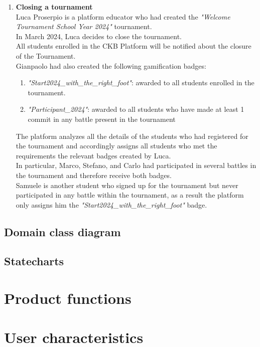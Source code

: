 \begin{enumerate}
\item \textbf{Closing a tournament}\\
Luca Proserpio is a platform educator who had created the \emph{"Welcome Tournament School Year 2024"} tournament.\\
In March 2024, Luca decides to close the tournament.\\
All students enrolled in the CKB Platform will be notified about the closure of the Tournament.\\
Gianpaolo had also created the following gamification badges:
			\begin{enumerate}
				\item \emph{"Start2024_with_the_right_foot"}: awarded to all students enrolled in the tournament.
				\item \emph{"Participant_2024"}: awarded to all students who have made at least 1 commit in any battle present in the tournament
			\end{enumerate}
The platform analyzes all the details of the students who had registered for the tournament and accordingly assigns all students who met the requirements the relevant badges created by Luca.\\
In particular, Marco, Stefano, and Carlo had participated in several battles in the tournament and therefore receive both badges.\\
Samuele is another student who signed up for the tournament but never participated in any battle within the tournament, as a result the platform only assigns him the \emph{"Start2024_with_the_right_foot"} badge.

\end{enumerate}


\subsection{Domain class diagram}

\subsection{Statecharts}




\section{Product functions}



\section{User characteristics}




